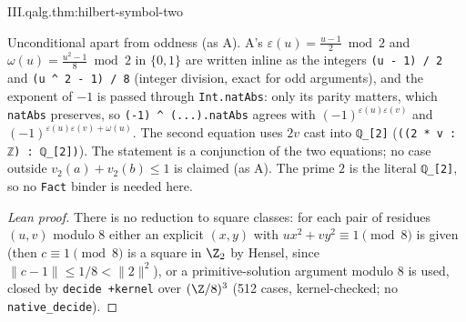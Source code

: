 \begin{theorem}
\end{theorem}
\begin{tfformal}{III.qalg.thm:hilbert-symbol-two}
\begin{tffidelity}
Unconditional apart from oddness (as A). A's $\varepsilon(u)=\frac{u-1}{2}\bmod2$ and $\omega(u)=\frac{u^2-1}{8}\bmod2$ in $\{0,1\}$ are written inline as the integers \texttt{(u - 1) / 2} and \texttt{(u \textasciicircum{} 2 - 1) / 8} (integer division, exact for odd arguments), and the exponent of $-1$ is passed through \texttt{Int.natAbs}: only its parity matters, which \texttt{natAbs} preserves, so \texttt{(-1) \textasciicircum{} (...).natAbs} agrees with $(-1)^{\varepsilon(u)\varepsilon(v)}$ and $(-1)^{\varepsilon(u)\varepsilon(v)+\omega(u)}$. The second equation uses $2v$ cast into \texttt{ℚ\_[2]} (\texttt{((2 * v : ℤ) : ℚ\_[2])}). The statement is a conjunction of the two equations; no case outside $v_2(a)+v_2(b)\le1$ is claimed (as A). The prime $2$ is the literal \texttt{ℚ\_[2]}, so no \texttt{Fact} binder is needed here.
\end{tffidelity}
\end{tfformal}
\begin{proof}[Lean proof]
There is no reduction to square classes: for each pair of residues $(u,v)$ modulo $8$ either an explicit $(x,y)$ with $ux^2+vy^2\equiv1\pmod 8$ is given (then $c\equiv1\pmod 8$ is a square in $\Z_2$ by Hensel, since $\|c-1\|\le1/8<\|2\|^2$), or a primitive-solution argument modulo $8$ is used, closed by \texttt{decide +kernel} over $(\Z/8)^3$ (512 cases, kernel-checked; no \texttt{native\_decide}).
\end{proof}

